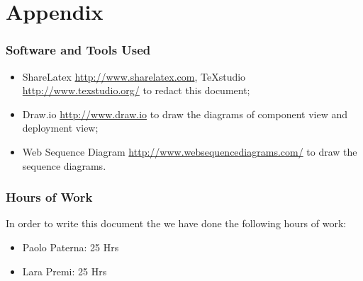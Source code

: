 \section{Appendix}
\subsubsection{Software and Tools Used}
	\begin{itemize}
		\item ShareLatex \url{http://www.sharelatex.com}, TeXstudio \url{http://www.texstudio.org/} to redact this document;
		\item Draw.io \url{http://www.draw.io} to draw the diagrams of component view and deployment view;
		\item Web Sequence Diagram \url{http://www.websequencediagrams.com/} to draw the sequence diagrams.
	\end{itemize}
\subsubsection{Hours of Work}
	In order to write this document the we have done the following hours of work:
	\begin{itemize}
		\item Paolo Paterna: 25 Hrs
		\item Lara Premi: 25 Hrs
	\end{itemize}